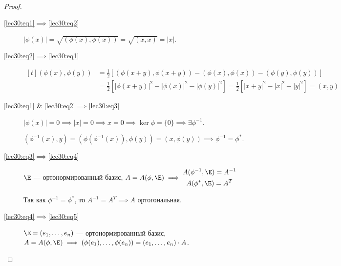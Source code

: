 \documentclass[a4paper]{article}
\begin{document}
\begin{colloq}
            \begin{proof}~
                \begin{description}
                    \item[\ref{lec30:eq1}$\implies$\ref{lec30:eq2}] $\left|\phi(x)\right| = \sqrt{(\phi(x), \phi(x))} = \sqrt{(x, x)} = |x|$.
                    \item[\ref{lec30:eq2}$\implies$\ref{lec30:eq1}] 
                        \begin{math}
                            \begin{aligned}[t]
                                (\phi(x), \phi(y)) &= \frac{1}{2} \left[(\phi(x + y), \phi(x + y)) - (\phi(x), \phi(x)) - (\phi(y), \phi(y))\right] \\
                                &= \frac{1}{2} \left[|\phi(x + y)|^2 - |\phi(x)|^2 - |\phi(y)|^2\right] = \frac{1}{2} \left[|x + y|^2 - |x|^2 - |y|^2\right] = (x, y)
                            \end{aligned}
                        \end{math}

                    \item[\ref{lec30:eq1} \& \ref{lec30:eq2}$\implies$\ref{lec30:eq3}] $|\phi(x)| = 0 \implies |x| = 0 \implies x = 0 \implies \ker \phi = \{0\} \implies \exists \phi^{-1}$.

                        $(\phi^{-1}(x), y) = (\phi(\phi^{-1}(x)), \phi(y)) = (x, \phi(y)) \implies \phi^{-1} = \phi^{*}$.

                    \item[\ref{lec30:eq3}$\implies$\ref{lec30:eq4}] $\E$ --- ортонормированный базис, 
                        \begin{math}
                            A = A(\phi, \E) \implies
                            \begin{gathered}
                                A(\phi^{-1}, \E) = A^{-1} \\
                                A(\phi^{*}, \E) = A^{T}
                            \end{gathered}
                        \end{math}

                        Так как $\phi^{-1} = \phi^{*}$, то $A^{-1} = A^{T} \implies A$ ортогональная.

                    \item[\ref{lec30:eq4}$\implies$\ref{lec30:eq5}] $\E = (e_1, \dots, e_n)$ --- ортонормированный базис, $A = A(\phi, \E) \implies (\phi(e_1), \dots, \phi(e_n)) = (e_1, \dots, e_n) \cdot A$.


\end{description}
\end{proof}
\end{colloq}
\end{document}
